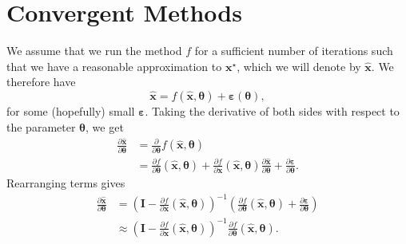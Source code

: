 \documentclass{article}
\newcommand{\mat}[1]{\bm{{#1}}}
\renewcommand{\vec}[1]{\bm{{#1}}}
\theoremstyle{definition}
\begin{document}
\section{Convergent Methods}
We assume that we run the method $f$ for a sufficient number of iterations such that we have a reasonable approximation to $\vec{x}^{\star}$, which we will denote by $\hat{\vec{x}}$.  We therefore have
\begin{equation}
  \hat{\vec{x}} = f\left(\hat{\vec{x}}, \vec{\theta}\right) + \vec{\varepsilon}\left(\vec{\theta}\right),
\end{equation}
for some (hopefully) small $\vec{\varepsilon}$.  Taking the derivative of both sides with respect to the parameter $\vec{\theta}$, we get
\begin{align}
  \frac{\partial \hat{\vec{x}}}{\partial \vec{\theta}}  &= \frac{\partial}{\partial \vec{\theta}} f\left(\hat{\vec{x}}, \vec{\theta}\right) \\
  &= \frac{\partial f}{\partial \vec{\theta}} \left(\hat{\vec{x}}, \vec{\theta}\right) + \frac{\partial f}{\partial \vec{x}} \left(\hat{\vec{x}}, \vec{\theta}\right) \frac{\partial \hat{\vec{x}}}{\partial \vec{\theta}} + \frac{\partial \vec{\varepsilon}}{\partial \vec{\theta}}.
\end{align}
Rearranging terms gives
\begin{align}
  \frac{\partial \hat{\vec{x}}}{\partial \vec{\theta}} &= \left(\mat{I} - \frac{\partial f}{\partial \vec{x}} \left(\hat{\vec{x}}, \vec{\theta}\right)\right)^{-1}\left( \frac{\partial f}{\partial \vec{\theta}} \left(\hat{\vec{x}}, \vec{\theta}\right) + \frac{\partial \vec{\varepsilon}}{\partial \vec{\theta}}\right) \\
  &\approx \left(\mat{I} - \frac{\partial f}{\partial \vec{x}} \left(\hat{\vec{x}}, \vec{\theta}\right)\right)^{-1} \frac{\partial f}{\partial \vec{\theta}} \left(\hat{\vec{x}}, \vec{\theta}\right). \label{eqn:fp_jac}
\end{align}
\end{document}
